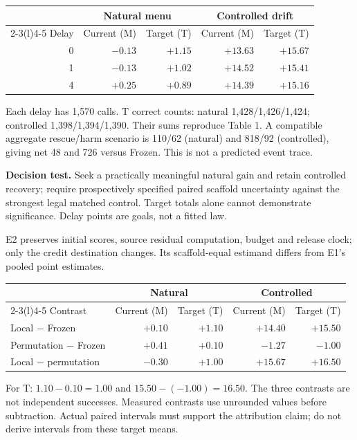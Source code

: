 \documentclass[10pt,letterpaper]{article}
\newcommand{\T}[1]{{\color{GuideBlue}#1}}
\newcommand{\note}[1]{{\fontsize{8.5}{10.5}\selectfont #1\par}}
\newcommand{\sectionhead}[1]{\vspace{7pt}{\large\bfseries #1}\par\vspace{3pt}}
\newenvironment{clean}{\begin{center}\fontsize{9.5}{11.5}\selectfont\setlength{\tabcolsep}{8pt}\renewcommand{\arraystretch}{1.10}}{\end{center}}
\begin{document}
\begin{minipage}{\linewidth}\end{minipage}
\begin{clean}
\begin{tabular}{@{}rrrrr@{}}
\toprule
& \multicolumn{2}{c}{Natural menu} & \multicolumn{2}{c}{Controlled drift} \\
\cmidrule(lr){2-3}\cmidrule(l){4-5}
Delay & Current (M) & Target (T) & Current (M) & Target (T) \\
\midrule
0 & $-0.13$ & \T{$+1.15$} & $+13.63$ & \T{$+15.67$} \\
1 & $-0.13$ & \T{$+1.02$} & $+14.52$ & \T{$+15.41$} \\
4 & $+0.25$ & \T{$+0.89$} & $+14.39$ & \T{$+15.16$} \\

\bottomrule
\end{tabular}
\end{clean}
\note{Each delay has 1,570 calls. T correct counts: natural 1,428/1,426/1,424; controlled 1,398/1,394/1,390. Their sums reproduce Table 1. A compatible aggregate rescue/harm scenario is 110/62 (natural) and 818/92 (controlled), giving net 48 and 726 versus Frozen. This is not a predicted event trace.}
\textbf{Decision test.} Seek a practically meaningful natural gain and retain controlled recovery; require prospectively specified paired scaffold uncertainty against the strongest legal matched control. Target totals alone cannot demonstrate significance. Delay points are goals, not a fitted law.

\newpage
\sectionhead{2. Mechanism and learnable headroom}
E2 preserves initial scores, source residual computation, budget and release clock; only the credit destination changes. Its scaffold-equal estimand differs from E1's pooled point estimates.
\begin{minipage}{\linewidth}\end{minipage}
\begin{clean}
\begin{tabular}{@{}lrrrr@{}}
\toprule
& \multicolumn{2}{c}{Natural} & \multicolumn{2}{c}{Controlled} \\
\cmidrule(lr){2-3}\cmidrule(l){4-5}
Contrast & Current (M) & Target (T) & Current (M) & Target (T) \\
\midrule
Local $-$ Frozen & $+0.10$ & \T{$+1.10$} & $+14.40$ & \T{$+15.50$} \\
Permutation $-$ Frozen & $+0.41$ & \T{$+0.10$} & $-1.27$ & \T{$-1.00$} \\
Local $-$ permutation & $-0.30$ & \T{$+1.00$} & $+15.67$ & \T{$+16.50$} \\

\bottomrule
\end{tabular}
\end{clean}
\note{For T: $1.10-0.10=1.00$ and $15.50-(-1.00)=16.50$. The three contrasts are not independent successes. Measured contrasts use unrounded values before subtraction. Actual paired intervals must support the attribution claim; do not derive intervals from these target means.}
\end{document}
